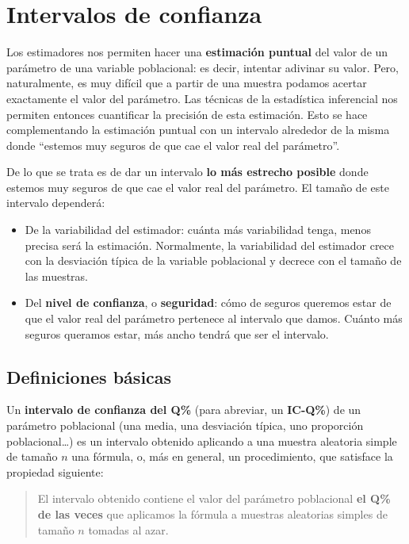 \documentclass[
  spanish,
  letterpaper,
  DIV=11,
  numbers=noendperiod]{scrreprt}
\begin{document}
\section{Intervalos de confianza}\label{intervalos-de-confianza}

Los estimadores nos permiten hacer una \textbf{estimación puntual} del
valor de un parámetro de una variable poblacional: es decir, intentar
adivinar su valor. Pero, naturalmente, es muy difícil que a partir de
una muestra podamos acertar exactamente el valor del parámetro. Las
técnicas de la estadística inferencial nos permiten entonces cuantificar
la precisión de esta estimación. Esto se hace complementando la
estimación puntual con un intervalo alrededor de la misma donde
``estemos muy seguros de que cae el valor real del parámetro''.

De lo que se trata es de dar un intervalo \textbf{lo más estrecho
posible} donde estemos muy seguros de que cae el valor real del
parámetro. El tamaño de este intervalo dependerá:

\begin{itemize}
\item
  De la variabilidad del estimador: cuánta más variabilidad tenga, menos
  precisa será la estimación. Normalmente, la variabilidad del estimador
  crece con la desviación típica de la variable poblacional y decrece
  con el tamaño de las muestras.
\item
  Del \textbf{nivel de confianza}, o \textbf{seguridad}: cómo de seguros
  queremos estar de que el valor real del parámetro pertenece al
  intervalo que damos. Cuánto más seguros queramos estar, más ancho
  tendrá que ser el intervalo.
\end{itemize}

\subsection{Definiciones básicas}\label{definiciones-buxe1sicas}

Un \textbf{intervalo de confianza del Q\%} (para abreviar, un
\textbf{IC-Q\%}) de un parámetro poblacional (una media, una desviación
típica, uno proporción poblacional\ldots) es un intervalo obtenido
aplicando a una muestra aleatoria simple de tamaño \(n\) una fórmula, o,
más en general, un procedimiento, que satisface la propiedad siguiente:

\begin{quote}
El intervalo obtenido contiene el valor del parámetro poblacional
\textbf{el Q\% de las veces} que aplicamos la fórmula a muestras
aleatorias simples de tamaño \(n\) tomadas al azar.
\end{quote}
\end{document}
